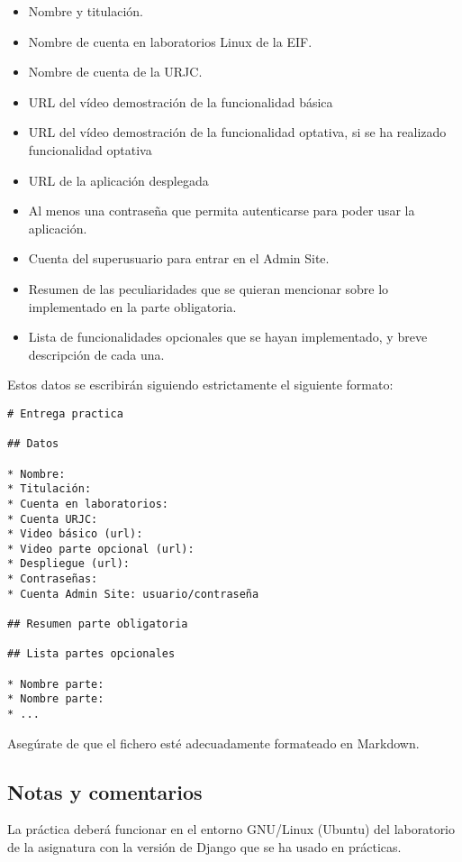 \begin{itemize}
\begin{itemize}
  \item Nombre y titulación.
  \item Nombre de cuenta en laboratorios Linux de la EIF.
  \item Nombre de cuenta de la URJC.
  \item URL del vídeo demostración de la funcionalidad básica
  \item URL del vídeo demostración de la funcionalidad optativa, si se ha realizado funcionalidad optativa
  \item URL de la aplicación desplegada
  \item Al menos una contraseña que permita autenticarse para poder usar la aplicación.
  \item Cuenta del superusuario para entrar en el Admin Site.
  \item Resumen de las peculiaridades que se quieran mencionar sobre lo implementado en la parte obligatoria.
  \item Lista de funcionalidades opcionales que se hayan implementado, y breve descripción de cada una.
\end{itemize}

Estos datos se escribirán siguiendo estrictamente el siguiente formato:

\begin{verbatim}
# Entrega practica

## Datos

* Nombre:
* Titulación:
* Cuenta en laboratorios:
* Cuenta URJC:
* Video básico (url):
* Video parte opcional (url):
* Despliegue (url):
* Contraseñas:
* Cuenta Admin Site: usuario/contraseña

## Resumen parte obligatoria

## Lista partes opcionales

* Nombre parte:
* Nombre parte:
* ...
\end{verbatim}

Asegúrate de que el fichero esté adecuadamente formateado en Markdown.
\end{itemize}


\subsection{Notas y comentarios}

La práctica deberá funcionar en el entorno GNU/Linux (Ubuntu) del laboratorio de la asignatura con la versión de Django que se ha usado en prácticas.

